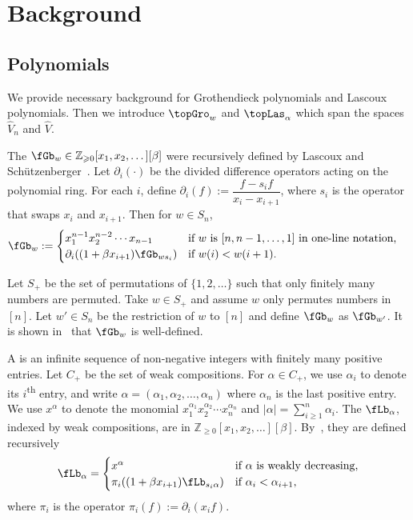 \section{Background}
\label{S: Background}
\subsection{Polynomials}
We provide necessary background
for Grothendieck polynomials and Lascoux polynomials.
Then we introduce
$\topGro_w$ and $\topLas_\alpha$ 
which span the spaces $\widehat{V}_n$ and $\widehat{V}$. 

The  $\fGb_w \in 
\mathbb{Z}_{\geqslant 0}[x_1, x_2, \dots][\beta]$
were recursively defined by Lascoux and Sch{\"u}tzenberger~\cite{LS:Groth}. 
Let $\partial_i(\cdot)$ be the divided difference operators acting 
on the polynomial ring.
For each $i$,
define $\partial_i(f) := \dfrac{f - s_i f}{x_i-x_{i+1}}$,
where $s_i$ is the operator that swaps $x_i$ and $x_{i+1}$.
Then for $w\in S_n$, 
\begin{align*}
\fGb_w &:=
\begin{cases}
x_1^{n-1}x_2^{n-2}\cdots x_{n-1} &\text{if $w$ is $[n, n-1, \dots, 1]$ in one-line notation,} \\
\partial_i( (1 + \beta x_{i+1}) \fGb_{ws_i} ) &\text{if $w(i)<w(i+1)$.}
\end{cases}
\end{align*}

Let $S_+$ be the set of permutations
of $\{1, 2, \dots\}$
such that only finitely many numbers are permuted.
Take $w \in S_+$ and assume $w$ only permutes numbers in $[n]$.
Let $w' \in S_n$ be the restriction of $w$ to $[n]$
and define $\fGb_w$ as $\fGb_{w'}$.
It is shown in~\cite{LS:Groth} that $\fGb_w$ is well-defined.

A 
is an infinite sequence of non-negative integers with finitely many positive entries. 
Let $C_+$ be the set of weak compositions. 
For $\alpha \in C_+$, 
we use $\alpha_i$ to denote its $i$\textsuperscript{th} entry,
and write $\alpha = (\alpha_1, \alpha_2, \dots, \alpha_n)$ 
where $\alpha_n$ is the last positive entry. 
We use $x^\alpha$ to denote the monomial
$x_1^{\alpha_1}x_2^{\alpha_2}\cdots x_n^{\alpha_n}$ and
$|\alpha| = \sum_{i\geqslant 1}^n\alpha_i$.
The  
$\fLb_\alpha$, indexed by weak compositions,
are in $\mathbb{Z}_{\geqslant 0}[x_1, x_2, \dots][\beta]$. 
By~\cite{Las}, they are defined recursively
\begin{align*}
\fLb_\alpha = \begin{cases}
x^\alpha & \text{if $\alpha$ is weakly decreasing,} \\
\pi_i ((1 + \beta x_{i+1}) \fLb_{s_i\alpha} ) &\text{if $\alpha_i<\alpha_{i+1}$,}
\end{cases}
\end{align*}
where $\pi_i$ is the operator $\pi_i(f) := \partial_i(x_i f)$.


